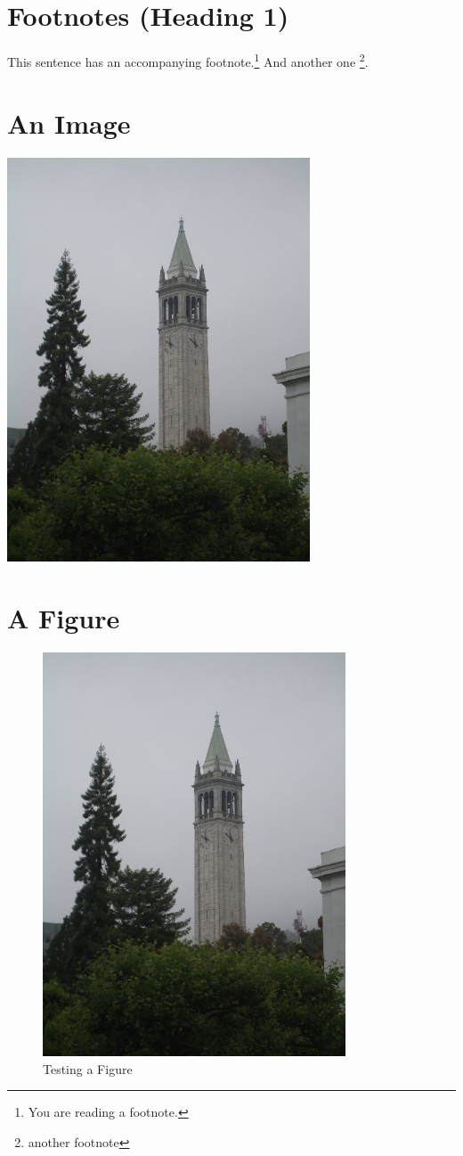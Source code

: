 \documentclass{article}
\begin{document}
\section{Footnotes (Heading 1)}

This sentence has an accompanying footnote.\footnote{You are reading a footnote.}   And
another one \footnote{another footnote}. 

\section{An Image}
 \includegraphics[width=9cm]{campanile_fog}

\section{A Figure}

\begin{figure}[ht]
  \includegraphics[width=9cm]{campanile_fog}
  \caption{Testing a Figure}
\end{figure}
\end{document}
